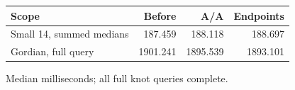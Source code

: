 \begin{center}\small
\begin{tabular}{@{}lrrr@{}}
\toprule
Scope & Before & A/A & Endpoints \\
\midrule
Small 14, summed medians & 187.459 & 188.118 & 188.697 \\
Gordian, full query & 1901.241 & 1895.539 & 1893.101 \\
\bottomrule
\end{tabular}
\end{center}
Median milliseconds; all full knot queries complete.
